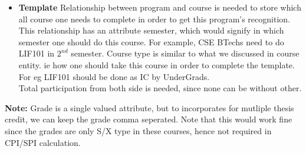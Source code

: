 \documentclass[a4paper]{article}
\begin{document}
\begin{itemize}
	\item{\textbf{Template}} Relationship between program and course is needed to store which all course one
	needs to complete in order to get this program's recognition. This relationship has an attribute semester,
	which would signify in which semester one should do this course. For example, CSE BTechs need to do LIF101
	in $2^{nd}$ semester. Course type is similar to what we discussed in course entity. ie how one should take this
	course in order to complete the template. For eg LIF101 should be done as IC by UnderGrads. \\
	Total participation from both side is needed, since none can be without other.
\end{itemize}

\textbf{Note:} Grade is a single valued attribute, but to incorporates for mutliple thesis credit, we can keep the grade comma seperated.  Note that this would work fine since the grades are only S/X type in these courses, hence not required in CPI/SPI calculation.

\pagebreak
\end{document}
